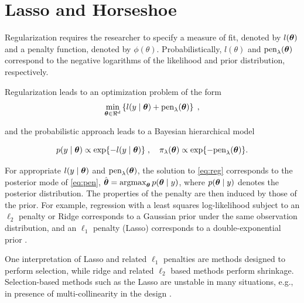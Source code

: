 \documentclass[sts,preprint]{imsart}
\begin{document}

\section{Lasso and Horseshoe}\label{sec:3}


Regularization requires the researcher to specify a measure of fit, denoted by $l(\boldsymbol{\theta})$ and a penalty function, denoted by $\phi(\theta)$. Probabilistically,  $l(\theta)$ and $\text{pen}_{\lambda}(\boldsymbol{\theta})$ correspond to the negative logarithms of the likelihood and prior distribution, respectively.  

Regularization leads to an optimization problem of the form 
\begin{equation}
  \min_{\boldsymbol{\theta} \in \Re^d}
  \left\{ l(y \mid \boldsymbol{\theta}) + \text{pen}_{\lambda}(\boldsymbol{\theta}) \right\}
  \;, 
  \label{eq:reg}
\end{equation}

and the probabilistic approach leads to a Bayesian hierarchical model

\begin{equation}
  p(y \mid \boldsymbol{\theta}) \propto \exp\{-l(y \mid \boldsymbol{\theta})\} \; , \quad \pi_{\lambda}(\boldsymbol{\theta})
  \propto \exp\{ -\text{pen}_{\lambda}(\boldsymbol{\theta}) \}. 
  \label{eq:pen}
\end{equation}

For appropriate $l(y \mid \boldsymbol{\theta})$ and $\text{pen}_{\lambda}(\boldsymbol{\theta})$, the solution to \eqref{eq:reg} corresponds to the posterior mode of \eqref{eq:pen}, $\hat{\btheta} = \argmax_{\btheta} p(\btheta \mid y)$, where $p(\boldsymbol{\theta} \mid y)$ denotes the posterior distribution. The properties of the penalty are then induced by those of the prior.  For example, regression with a least squares log-likelihood subject to an $\ell_2$ penalty or Ridge \citep{tikhonov1963solution, hoerl70} corresponds to a Gaussian prior under the same observation distribution, and an $\ell_1$ penalty (Lasso) \citep{tibshirani96} corresponds to a double-exponential prior \citep{park_bayesian_2008}.

One interpretation of Lasso and related $\ell_1$ penalties are methods designed to perform selection, while ridge and related $\ell_2$ based methods perform shrinkage. Selection-based methods such as the Lasso are unstable in many situations, e.g., in presence of multi-collinearity in the design \citep[ch.3]{hastie_elements_2009}. 
\end{document}
